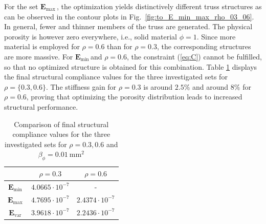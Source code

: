 \documentclass[
	pdflatex,
	sn-mathphys-num
]{sn-jnl}
\newcommand{\Evar}{\ensuremath{\mathbf{E}_{\text{var}}}{\,}}
\newcommand{\Emin}{\ensuremath{\mathbf{E}_{\text{min}}}{\,}}
\newcommand{\Emax}{\ensuremath{\mathbf{E}_{\text{max}}}{\,}}
\theoremstyle{thmstyleone}%
\theoremstyle{thmstyletwo}%
\theoremstyle{thmstylethree}%
\begin{document}

For the set \Emax, the optimization yields distinctively
different truss structures as can be observed in the contour
plots in Fig.~\ref{fig:to_E_min_max_rho_03_06}. In general,
fewer and thinner members of the truss are generated. The
physical porosity is however zero everywhere, i.e., solid
material $\phi=1$. Since more material is employed for
$\rho=0.6$ than for $\rho=0.3$, the corresponding structures
are more massive. For \Emin and $\rho=0.6$, the constraint
(\ref{eq:C}) cannot be fulfilled, so that no optimized
structure is obtained for this combination. Table
\ref{tab:TO_Psi_comp} displays the final structural compliance
values for the three investigated sets for $\rho=\{0.3,0.6\}$.
The stiffness gain for $\rho=0.3$ is around $2.5\%$ and around
$8\%$ for $\rho=0.6$, proving that optimizing the porosity
distribution leads to increased structural performance.

\begin{table}[]
    \centering
    \begin{tabular}{ccc}
         & $\rho=0.3$&$\rho=0.6$  \\
         \hline
         \Emin & $4.0665\cdot10^{-7}$& - \\
         \hline
         \Emax & $4.7695\cdot10^{-7}$ & $2.4374\cdot10^{-7}$ \\
         \hline
         \Evar & $3.9618\cdot10^{-7}$ & $2.2436\cdot10^{-7}$
    \end{tabular}
    \caption{Comparison of final structural compliance values for the three investigated sets for $\rho={0.3,0.6}$ and $\beta_{\phi}=0.01~\mathrm{mm^2}$}
    \label{tab:TO_Psi_comp}
\end{table}

\end{document}
